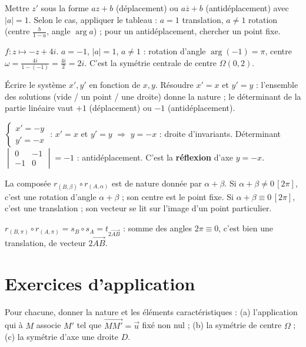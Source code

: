 Mettre $z'$ sous la forme $az+b$ (déplacement) ou $a\overline z+b$ (antidéplacement) avec $|a|=1$. Selon le cas, appliquer le tableau : $a=1$ translation, $a\neq1$ rotation (centre $\frac b{1-a}$, angle $\arg a$) ; pour un antidéplacement, chercher un point fixe.
\begin{exemple}
$f:z\mapsto -z+4i$. $a=-1$, $|a|=1$, $a\neq1$ : rotation d'angle $\arg(-1)=\pi$, centre $\omega=\frac{4i}{1-(-1)}=\frac{4i}2=2i$. C'est la symétrie centrale de centre $\Omega(0,2)$.
\end{exemple}

Écrire le système $x',y'$ en fonction de $x,y$. Résoudre $x'=x$ et $y'=y$ : l'ensemble des solutions (vide / un point / une droite) donne la nature ; le déterminant de la partie linéaire vaut $+1$ (déplacement) ou $-1$ (antidéplacement).
\begin{exemple}
$\begin{cases}x'=-y\\ y'=-x\end{cases}$ : $x'=x$ et $y'=y$ $\Rightarrow$ $y=-x$ : droite d'invariants. Déterminant $\begin{vmatrix}0&-1\\-1&0\end{vmatrix}=-1$ : antidéplacement. C'est la \textbf{réflexion} d'axe $y=-x$.
\end{exemple}

La composée $r_{(B,\beta)}\circ r_{(A,\alpha)}$ est de nature donnée par $\alpha+\beta$. Si $\alpha+\beta\neq0\,[2\pi]$, c'est une rotation d'angle $\alpha+\beta$ ; son centre est le point fixe. Si $\alpha+\beta\equiv0\,[2\pi]$, c'est une translation ; son vecteur se lit sur l'image d'un point particulier.
\begin{exemple}
$r_{(B,\pi)}\circ r_{(A,\pi)}=s_B\circ s_A=t_{2\overrightarrow{AB}}$ : somme des angles $2\pi\equiv0$, c'est bien une translation, de vecteur $2\overrightarrow{AB}$.
\end{exemple}

\section{Exercices d'application}

\exo{} Pour chacune, donner la nature et les éléments caractéristiques : (a) l'application qui à $M$ associe $M'$ tel que $\overrightarrow{MM'}=\vec u$ fixé non nul ; (b) la symétrie de centre $\Omega$ ; (c) la symétrie d'axe une droite $D$.

